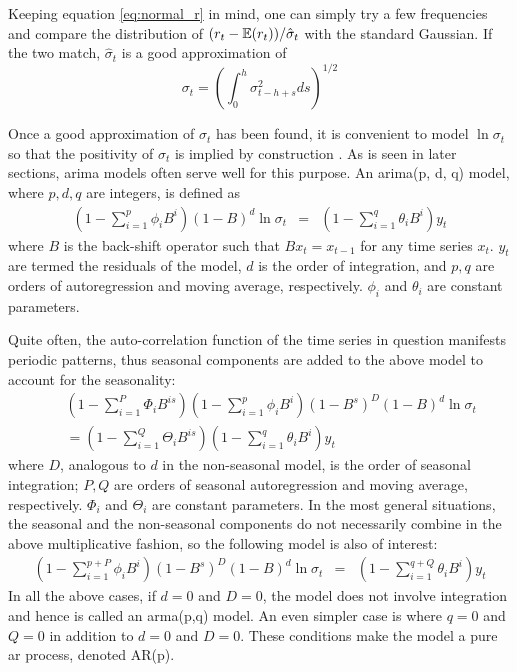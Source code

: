 \begin{enumerate}
Keeping equation \ref{eq:normal_r} in mind, one can simply try a few
frequencies and compare the distribution of $(r_t -
\mathbb{E}(r_t))/\hat{\sigma}_t$ with the standard Gaussian. If the two match,
$\hat{\sigma}_t$ is a good approximation of
\[
\sigma_t = \left(\int_{0}^h \sigma_{t-h+s}^2 ds \right)^{1/2}
\]

Once a good approximation of $\sigma_t$ has been found, it is
convenient to model $\ln\sigma_t$ so that the positivity of $\sigma_t$
is implied by construction \cite{Mikosch2009}. As is seen in later
sections, \gls{arima} models often serve well for this purpose. An
\gls{arima}(p, d, q) model, where $p,d,q$ are integers, is defined as
\cite{BoxJenkins94}
\begin{eqnarray*}
  (1 - \sum_{i=1}^p \phi_i B^i) (1 - B)^d \ln \sigma_t &=& (1 -
  \sum_{i=1}^q \theta_i B^i) y_t
\end{eqnarray*}
where $B$ is the back-shift operator such that $B x_t = x_{t-1}$ for
any time series $x_t$. $y_t$ are termed the residuals of the
model, $d$ is the order of integration, and $p, q$  are orders of
autoregression and moving average, respectively. $\phi_i$ and
$\theta_i$ are constant parameters.

Quite often, the auto-correlation function of the time series in
question manifests periodic patterns, thus seasonal components are
added to the above model to account for the seasonality:
\begin{eqnarray*}
&& (1 - \sum_{i=1}^P \Phi_i B^{is}) (1 - \sum_{i=1}^p \phi_i B^i) (1 - B^s)^D (1 -
B)^d\ln \sigma_t \\
&& = (1 - \sum_{i=1}^Q \Theta_i B^{is}) (1 -
\sum_{i=1}^q \theta_i B^i)y_t
\end{eqnarray*}
where $D$, analogous to $d$ in the non-seasonal model, is the order of
seasonal integration; $P, Q$ are orders of seasonal autoregression and
moving average, respectively. $\Phi_i$ and $\Theta_i$ are constant
parameters. In the most general situations, the seasonal and the
non-seasonal components do not necessarily combine in the above
multiplicative fashion, so the following model is also of interest:
\begin{eqnarray*}
(1 - \sum_{i=1}^{p+P} \phi_i B^i) (1 - B^s)^D(1 - B)^d \ln
\sigma_t &=& (1 - \sum_{i=1}^{q+Q} \theta_i B^i) y_t
\end{eqnarray*}
In all the above cases, if $d = 0$ and $D = 0$, the model does not
involve integration and hence is called an \gls{arma}(p,q) model. An
even simpler case is where $q = 0$ and $Q = 0$ in addition to $d = 0$
and $D = 0$. These conditions make the model a pure \gls{ar}
process, denoted AR(p).
\end{enumerate}

